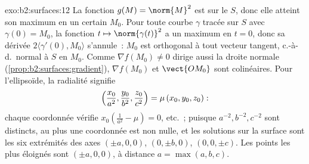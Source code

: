 \begin{solution}{exo:b2:surfaces:12}
La fonction $g(M) = \norm{M}^2$ est  sur le 
$S$, donc elle atteint son maximum en un certain $M_0$. Pour toute courbe
$\gamma$ tracée sur $S$ avec $\gamma(0) = M_0$, la fonction $t
\mapsto \norm{\gamma(t)}^2$ a un maximum en $t = 0$, donc sa
dérivée $2\langle\gamma'(0), M_0\rangle$ s'annule~: $M_0$ est
orthogonal à tout vecteur tangent, c.-à-d.\ normal à $S$ en
$M_0$. Comme $\nabla f(M_0) \neq 0$ dirige aussi la droite normale
(\cref{prop:b2:surfaces:gradient}), $\nabla f(M_0)$ et
$\vect{OM_0}$ sont colinéaires. Pour l'ellipsoïde, la radialité
signifie
\[
\Bigl(\frac{x_0}{a^2}, \frac{y_0}{b^2},
\frac{z_0}{c^2}\Bigr) = \mu\,(x_0, y_0, z_0) :
\]
chaque coordonnée vérifie $x_0(\frac1{a^2} - \mu) = 0$, etc.~;
puisque $a^{-2}, b^{-2}, c^{-2}$ sont distincts, au plus une
coordonnée est non nulle, et les solutions sur la surface sont
les six extrémités des axes $(\pm a, 0, 0)$, $(0, \pm b, 0)$, $(0,
0, \pm c)$. Les points les plus éloignés sont $(\pm a, 0, 0)$, à
distance $a = \max(a,b,c)$.
\end{solution}

